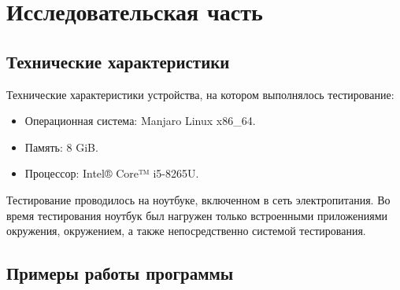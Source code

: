 \chapter{Исследовательская часть}

\section{Технические характеристики}

Технические характеристики устройства, на котором выполнялось тестирование:

\begin{itemize}
	\item Операционная система: Manjaro \cite{manjaro} Linux x86\_64.
	\item Память: 8 GiB.
	\item Процессор: Intel® Core™ i5-8265U\cite{intel}.
\end{itemize}

Тестирование проводилось на ноутбуке, включенном в сеть электропитания. Во
время тестирования ноутбук был нагружен только встроенными приложениями
окружения, окружением, а также непосредственно системой тестирования.

\section{Примеры работы программы}

